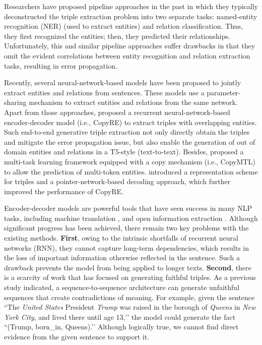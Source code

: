 \documentclass[letterpaper]{article} \usepackage{aaai21}  \usepackage{times}  \usepackage{helvet} \usepackage{courier}  \usepackage[hyphens]{url}  \usepackage{graphicx} \urlstyle{rm} \def\UrlFont{\rm}  \usepackage{natbib}  \usepackage[noend]{algpseudocode}
\begin{document}
Researchers have proposed pipeline approaches in the past \cite{Lample2016NeuralAF,zeng2015distant} in which they typically deconstructed the triple extraction problem into two separate tasks: named-entity recognition (NER) (used to extract entities) and relation classification. Thus, they first recognized the entities; then, they predicted their relationships. Unfortunately, this and similar pipeline approaches suffer drawbacks \cite{roth2007global} in that they omit the evident correlations between entity recognition and relation extraction tasks, resulting in error propagation. 

Recently, several neural-network-based models \cite{zeng2018extracting} have been proposed to jointly extract entities and relations from sentences. These models use a parameter-sharing mechanism to extract entities and relations from the same network. Apart from those approaches, \citet{zeng-etal-2018-extracting} proposed a recurrent neural-network-based encoder-decoder model (i.e., CopyRE) to extract triples with overlapping entities. Such end-to-end generative triple extraction not only directly obtain the triples and mitigate the error propagation issue, but also enable the generation of out of domain entities and relations in a T5-style  \cite{raffel2019exploring} (text-to-text).  Besides, \citet{zeng2020copymtl} proposed a multi-task learning framework equipped with a copy mechanism (i.e., CopyMTL) to allow the prediction of multi-token entities. \citet{nayak2019effective} introduced a representation scheme for triples and a pointer-network-based decoding approach, which further improved the performance of CopyRE.

Encoder-decoder models are powerful tools that have seen success in many NLP tasks, including machine translation \cite{cho2014learning}, and open information extraction \cite{zhang2017selective}. Although significant progress has been achieved, there remain two key problems with the existing methods. \textbf{First}, owing to the intrinsic shortfalls of recurrent neural networks (RNN), they cannot capture long-term dependencies, which results in the loss of important information otherwise reflected in the sentence. Such a drawback prevents the model from being applied to longer texts. \textbf{Second}, there is a scarcity of work that has focused on generating faithful triples. As a previous study \cite{zhu2020boosting} indicated, a sequence-to-sequence architecture can generate unfaithful sequences that create contradictions of meaning. For example, given the sentence ``The \emph{United States} President \emph{Trump} was raised in the borough of \emph{Queens} in \emph{New York City}, and lived there until age 13,’’  the model could generate the fact ``(Trump, born\_in, Queens).’’ Although logically true, we cannot find direct evidence from the given sentence to support it. 
\end{document}
